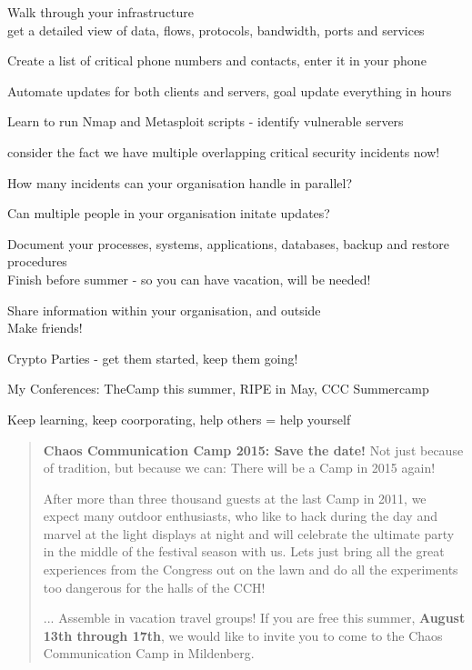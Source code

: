 \documentclass[20pt,landscape,a4paper,footrule]{foils}
\begin{document}
\begin{list2}
\item Walk through your infrastructure\\
get a detailed view of data, flows, protocols, bandwidth, ports and services

\item Create a list of critical phone numbers and contacts, enter it in your phone
\item Automate updates for both clients and servers, goal update everything in hours
\item Learn to run Nmap and Metasploit scripts - identify vulnerable servers
\end{list2}

\vskip 2cm
\centerline{consider the fact we have multiple overlapping critical security incidents now!}

\vskip 2cm
How many incidents can your organisation handle in parallel?

Can multiple people in your organisation initate updates?



\begin{list2}
\item Document your processes, systems, applications, databases, backup and restore procedures\\
Finish before summer - so you can have vacation, will be needed!
\item Share information within your organisation, and outside\\
Make friends!
\item Crypto Parties - get them started, keep them going!
\item My Conferences: TheCamp this summer, RIPE in May, CCC Summercamp
\end{list2}

\vskip 2cm
\centerline{Keep learning, keep coorporating, help others = help yourself}


\begin{quote}
{\bf Chaos Communication Camp 2015: Save the date!}
Not just because of tradition, but because we can: There will be a Camp in 2015 again!

After more than three thousand guests at the last Camp in 2011, we expect many outdoor enthusiasts, who like to hack during the day and marvel at the light displays at night and will celebrate the ultimate party in the middle of the festival season with us. Lets just bring all the great experiences from the Congress out on the lawn and do all the experiments too dangerous for the halls of the CCH!

...
Assemble in vacation travel groups! If you are free this summer, {\bf August 13th through 17th}, we would like to invite you to come to the Chaos Communication Camp in Mildenberg.
\end{quote}
\end{document}
